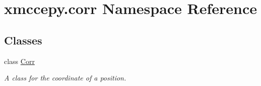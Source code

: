 \hypertarget{namespacexmccepy_1_1corr}{\section{xmccepy.\-corr Namespace Reference}
\label{namespacexmccepy_1_1corr}
}
\subsection*{Classes}
\begin{DoxyCompactItemize}
\item 
class \hyperlink{classxmccepy_1_1corr_1_1_corr}{Corr}
\begin{DoxyCompactList}\small\item\em A class for the coordinate of a position. \end{DoxyCompactList}\end{DoxyCompactItemize}
